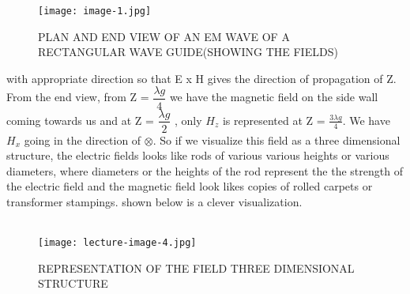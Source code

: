 	\begin{figure}[H]
		\centering
		\texttt{[image: image-1.jpg]}
		\caption{PLAN AND END VIEW OF AN EM WAVE OF A RECTANGULAR WAVE GUIDE(SHOWING THE FIELDS)}
	\end{figure}
	
	with appropriate direction so that E x H gives the direction of propagation of Z. From the end view, from Z = $\dfrac{\lambda g}{4}$ we have the magnetic field on the side wall coming towards us and at Z = $\dfrac{\lambda g}{2}$ , only $H_{z}$ is represented at 
	Z = $\frac{3\lambda g}{4}$. We have $H_{x}$ going in the direction of $\otimes$. So if we visualize this field as a three dimensional structure, the electric fields looks like rods of various various heights or various diameters, where diameters or the heights of the
	rod represent the the strength of the electric field and the magnetic field look likes copies of rolled carpets or transformer stampings. shown below is a clever visualization.\\\\
	
	\begin{figure}[H]
		\centering
		\texttt{[image: lecture-image-4.jpg]}
		\caption{REPRESENTATION OF THE FIELD THREE DIMENSIONAL STRUCTURE}
	\end{figure}
		
